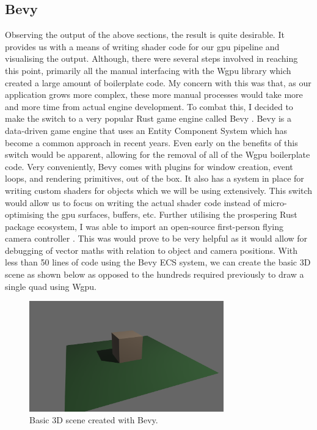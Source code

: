 \documentclass[titlepage]{article}
\begin{document}
\subsection{Bevy}
Observing the output of the above sections, the result is quite desirable. It provides us with a means of writing shader code for our \acrshort{gpu} pipeline and visualising the output. Although, there were several steps involved in reaching this point, primarily all the manual interfacing with the Wgpu library which created a large amount of boilerplate code. My concern with this was that, as our application grows more complex, these more manual processes would take more and more time from actual engine development. To combat this, I decided to make the switch to a very popular Rust game engine called Bevy \cite{bevy}. Bevy is a data-driven game engine that uses an Entity Component System which has become a common approach in recent years. Even early on the benefits of this switch would be apparent, allowing for the removal of all of the Wgpu boilerplate code. Very conveniently, Bevy comes with plugins for window creation, event loops, and rendering primitives, out of the box. It also has a system in place for writing custom shaders for objects which we will be using extensively. This switch would allow us to focus on writing the actual shader code instead of micro-optimising the \acrshort{gpu} surfaces, buffers, etc. Further utilising the prospering Rust package ecosystem, I was able to import an open-source first-person flying camera controller \cite{flycam}. This was would prove to be very helpful as it would allow for debugging of vector maths with relation to object and camera positions. With less than 50 lines of code using the Bevy ECS system, we can create the basic 3D scene as shown below as opposed to the hundreds required previously to draw a single quad using Wgpu.

\begin{figure}[htp]
    \centering
    \includegraphics[width=0.75\textwidth]{bevy.png}
    \caption{Basic 3D scene created with Bevy.}
\end{figure}
\FloatBarrier
\end{document}
